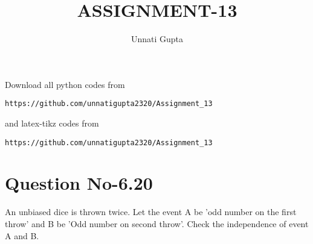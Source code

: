\documentclass[journal,12pt,twocolumn]{IEEEtran}
\begin{document}
     \def\centbox#1{\makebox[0in]{#1}}
     \def\topbox#1{\raisebox{-\baselineskip}[0in][0in]{#1}}
     \def\midbox#1{\raisebox{-0.5\baselineskip}[0in][0in]{#1}}
\vspace{3cm}
\title{ASSIGNMENT-13}
\author{Unnati Gupta}
\maketitle
\newpage
\bigskip
\renewcommand{\thefigure}{\theenumi}
\renewcommand{\thetable}{\theenumi}
Download all python codes from 
\begin{lstlisting}
https://github.com/unnatigupta2320/Assignment_13
\end{lstlisting}
%
and latex-tikz codes from 
%
\begin{lstlisting}
https://github.com/unnatigupta2320/Assignment_13
\end{lstlisting}
%
\section{Question No-6.20}
An unbiased dice is thrown twice. Let the event A be 'odd number on the first throw' and B be 'Odd number on second throw'. Check the independence of event A and B. 
\end{document}
